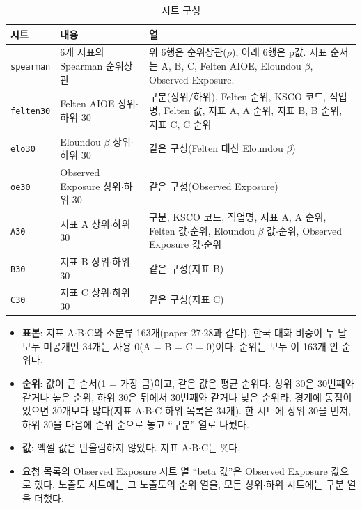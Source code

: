 \documentclass[11pt]{article}
\begin{document}
\begin{small}
\begin{longtable}{L{2.0cm}L{4.2cm}L{8.6cm}}
\caption{시트 구성}\label{tab:sheets}\\
\toprule
시트 & 내용 & 열 \\
\midrule
\endfirsthead
\texttt{spearman} & 6개 지표의 Spearman 순위상관 & 위 6행은 순위상관($\rho$), 아래 6행은 p값. 지표 순서는 A, B, C, Felten AIOE, Eloundou $\beta$, Observed Exposure. \\
\texttt{felten30} & Felten AIOE 상위$\cdot$하위 30 & 구분(상위$/$하위), Felten 순위, KSCO 코드, 직업명, Felten 값, 지표 A, A 순위, 지표 B, B 순위, 지표 C, C 순위 \\
\texttt{elo30} & Eloundou $\beta$ 상위$\cdot$하위 30 & 같은 구성(Felten 대신 Eloundou $\beta$) \\
\texttt{oe30} & Observed Exposure 상위$\cdot$하위 30 & 같은 구성(Observed Exposure) \\
\texttt{A30} & 지표 A 상위$\cdot$하위 30 & 구분, KSCO 코드, 직업명, 지표 A, A 순위, Felten 값$\cdot$순위, Eloundou $\beta$ 값$\cdot$순위, Observed Exposure 값$\cdot$순위 \\
\texttt{B30} & 지표 B 상위$\cdot$하위 30 & 같은 구성(지표 B) \\
\texttt{C30} & 지표 C 상위$\cdot$하위 30 & 같은 구성(지표 C) \\
\bottomrule
\end{longtable}
\end{small}

\begin{itemize}[leftmargin=*]
  \item \textbf{표본}: 지표 A$\cdot$B$\cdot$C와 소분류 163개(paper 27$\cdot$28과 같다). 한국 대화 비중이 두 달 모두 미공개인 34개는 사용 0(A = B = C = 0)이다. 순위는 모두 이 163개 안 순위다.
  \item \textbf{순위}: 값이 큰 순서(1 = 가장 큼)이고, 같은 값은 평균 순위다. 상위 30은 30번째와 같거나 높은 순위, 하위 30은 뒤에서 30번째와 같거나 낮은 순위라, 경계에 동점이 있으면 30개보다 많다(지표 A$\cdot$B$\cdot$C 하위 목록은 34개). 한 시트에 상위 30을 먼저, 하위 30을 다음에 순위 순으로 놓고 ``구분'' 열로 나눴다.
  \item \textbf{값}: 엑셀 값은 반올림하지 않았다. 지표 A$\cdot$B$\cdot$C는 \%다.
  \item 요청 목록의 Observed Exposure 시트 열 ``beta 값''은 Observed Exposure 값으로 했다. 노출도 시트에는 그 노출도의 순위 열을, 모든 상위$\cdot$하위 시트에는 구분 열을 더했다.
\end{itemize}
\end{document}
